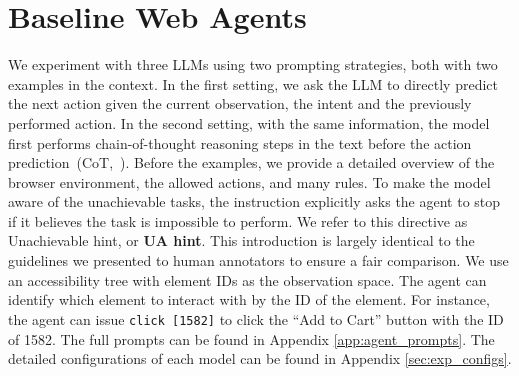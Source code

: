 \documentclass{article}
\begin{document}
\section{Baseline Web Agents}\label{sec:baseline_agents}
We experiment with three LLMs using two prompting strategies, both with two examples in the context. In the first setting, we ask the LLM to directly predict the next action given the current observation, the intent and the previously performed action. 
In the second setting, with the same information, the model first performs chain-of-thought reasoning steps in the text before the action prediction~(CoT,~\citet{wei2022chain, yao2022react}). 
Before the examples, we provide a detailed overview of the browser environment, the allowed actions, and many rules.
To make the model aware of the unachievable tasks, the instruction explicitly asks the agent to stop if it believes the task is impossible to perform. We refer to this directive as Unachievable hint, or \textbf{UA hint}.
This introduction is largely identical to the guidelines we presented to human annotators to ensure a fair comparison.
We use an accessibility tree with element IDs as the observation space.
The agent can identify which element to interact with by the ID of the element. For instance, the agent can issue \texttt{click [1582]} to click the ``Add to Cart'' button with the ID of 1582.
The full prompts can be found in Appendix \ref{app:agent_prompts}.
The detailed configurations of each model can be found in Appendix \ref{sec:exp_configs}.
\end{document}
